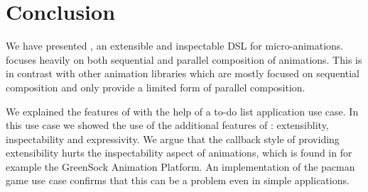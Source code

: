 \section{Conclusion}
\label{sec:conclusion}

We have presented \dsl{}, an extensible and inspectable DSL for micro-animations. \dsl{} focuses heavily on both sequential and parallel composition of animations. This is in contrast with other animation libraries which are mostly focused on sequential composition and only provide a limited form of parallel composition.

We explained the features of \dsl{} with the help of a to-do list application use case. In this use case we showed the use of the additional features of \dsl{}: extensiblity, inspectability and expressivity. We argue that the callback style of providing extensibility hurts the inspectability aspect of animations, which is found in for example the GreenSock Animation Platform. An implementation of the pacman game use case confirms that this can be a problem even in simple applications.
